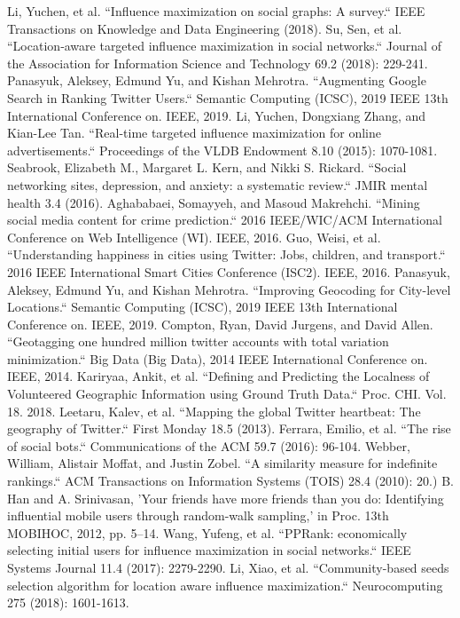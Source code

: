 \begin{thebibliography}{200}
 Li, Yuchen, et al. ``Influence maximization on social graphs: A survey.`` IEEE Transactions on Knowledge and Data Engineering (2018).\label{appendix:3.1}
 Su, Sen, et al. ``Location‐aware targeted influence maximization in social networks.`` Journal of the Association for Information Science and Technology 69.2 (2018): 229-241.\label{appendix:3.2}
 Panasyuk, Aleksey, Edmund Yu, and Kishan Mehrotra. ``Augmenting Google Search in Ranking Twitter Users.`` Semantic Computing (ICSC), 2019 IEEE 13th International Conference on. IEEE, 2019.\label{appendix:3.3}
 Li, Yuchen, Dongxiang Zhang, and Kian-Lee Tan. ``Real-time targeted influence maximization for online advertisements.`` Proceedings of the VLDB Endowment 8.10 (2015): 1070-1081.\label{appendix:3.5}
 Seabrook, Elizabeth M., Margaret L. Kern, and Nikki S. Rickard. ``Social networking sites, depression, and anxiety: a systematic review.`` JMIR mental health 3.4 (2016).\label{appendix:3.6}
 Aghababaei, Somayyeh, and Masoud Makrehchi. ``Mining social media content for crime prediction.`` 2016 IEEE/WIC/ACM International Conference on Web Intelligence (WI). IEEE, 2016.\label{appendix:3.7}
 Guo, Weisi, et al. ``Understanding happiness in cities using Twitter: Jobs, children, and transport.`` 2016 IEEE International Smart Cities Conference (ISC2). IEEE, 2016.\label{appendix:3.8}
 Panasyuk, Aleksey, Edmund Yu, and Kishan Mehrotra. ``Improving Geocoding for City-level Locations.`` Semantic Computing (ICSC), 2019 IEEE 13th International Conference on. IEEE, 2019.\label{appendix:3.11}
 Compton, Ryan, David Jurgens, and David Allen. ``Geotagging one hundred million twitter accounts with total variation minimization.`` Big Data (Big Data), 2014 IEEE International Conference on. IEEE, 2014.\label{appendix:3.13}
 Kariryaa, Ankit, et al. ``Defining and Predicting the Localness of Volunteered Geographic Information using Ground Truth Data.`` Proc. CHI. Vol. 18. 2018.\label{appendix:3.14}
 Leetaru, Kalev, et al. ``Mapping the global Twitter heartbeat: The geography of Twitter.`` First Monday 18.5 (2013).\label{appendix:3.15}
 Ferrara, Emilio, et al. ``The rise of social bots.`` Communications of the ACM 59.7 (2016): 96-104.\label{appendix:3.17}
 Webber, William, Alistair Moffat, and Justin Zobel. ``A similarity measure for indefinite rankings.`` ACM Transactions on Information Systems (TOIS) 28.4 (2010): 20.)\label{appendix:3.21}
 B. Han and A. Srinivasan, 'Your friends have more friends than you do: Identifying influential mobile users through random-walk sampling,' in  Proc. 13th MOBIHOC, 2012, pp. 5--14.\label{appendix:3.22}
 Wang, Yufeng, et al. ``PPRank: economically selecting initial users for influence maximization in social networks.`` IEEE Systems Journal 11.4 (2017): 2279-2290.\label{appendix:3.23}
 Li, Xiao, et al. ``Community-based seeds selection algorithm for location aware influence maximization.`` Neurocomputing 275 (2018): 1601-1613.\label{appendix:3.24}


\end{thebibliography}
